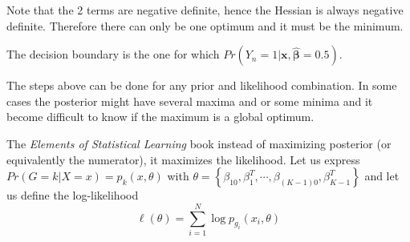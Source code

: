 \documentclass[12pt, letterpaper]{article}
\theoremstyle{definition}
\newcommand{\be}{\mathbf{\beta}}
\newcommand{\x}{\mathbf{x}}
\begin{document}
Note that the 2 terms are negative definite, hence the Hessian is always negative definite. Therefore there can only be one optimum and it must be the minimum.

The decision boundary is the one for which $Pr(Y_n=1|\x,\hat{\be}=0.5)$.

The steps above can be done for any prior and likelihood combination. In some cases the posterior might have several maxima and or some minima and it become difficult to know if the maximum is a global optimum.


The \textit{Elements of Statistical Learning} book instead of maximizing posterior (or equivalently the numerator), it maximizes the likelihood.
Let us express $Pr\left(G=k|X=x\right)=p_k(x,\theta)$ with $\theta = \left\lbrace \beta_{10},\beta_1^T,\cdots, \beta_{\left(K-1\right)0},\beta_{K-1}^T\right\rbrace$
and let us define the log-likelihood
\begin{equation}
\ell(\theta) = \sum_{i=1}^N \log p_{g_i}\left(x_i, \theta\right)
\end{equation}
\end{document}
